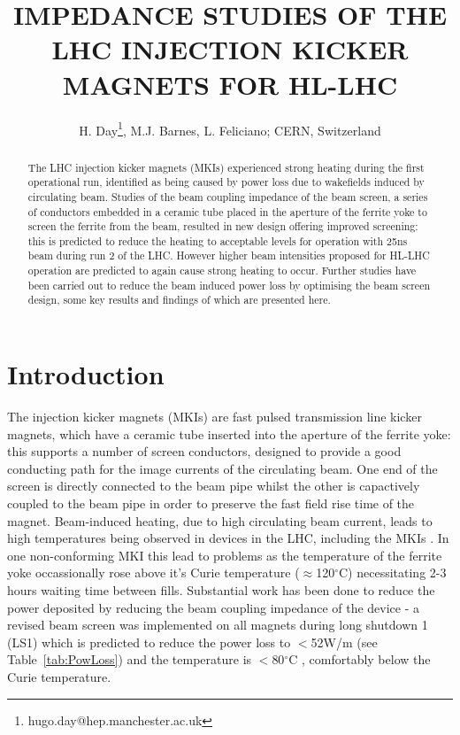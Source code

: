 \documentclass[a4paper,
              ]{jacow}
\begin{document}
\title{IMPEDANCE STUDIES OF THE LHC INJECTION KICKER MAGNETS FOR HL-LHC}
\author{H. Day\thanks{hugo.day@hep.manchester.ac.uk}, M.J. Barnes, L. Feliciano;  CERN, Switzerland}

\maketitle 


\begin{abstract}
The LHC injection kicker magnets (MKIs) experienced strong heating during the first operational run, identified as being caused by power loss due to wakefields induced by circulating beam. Studies of the beam coupling impedance of the beam screen, a series of conductors embedded in a ceramic tube placed in the aperture of the ferrite yoke to screen the ferrite from the beam, resulted in new design offering improved screening: this is predicted to reduce the heating to acceptable levels for operation with 25ns beam during run 2 of the LHC. However higher beam intensities proposed for HL-LHC operation are predicted to again cause strong heating to occur. Further studies have been carried out to reduce the beam induced power loss by optimising the beam screen design, some key results and findings of which are presented here.
\end{abstract}

\section{Introduction}

The injection kicker magnets (MKIs) are fast pulsed transmission line kicker magnets, which have a ceramic tube inserted into the aperture of the ferrite yoke: this supports a number of screen conductors, designed to provide a good conducting path for the image currents of the circulating beam. One end of the screen is directly connected to the beam pipe whilst the other is capactively coupled to the beam pipe in order to preserve the fast field rise time of the magnet. Beam-induced heating, due to high circulating beam current, leads to high temperatures being observed in devices in the LHC, including the MKIs \cite{mki-heatingTemp}. In one non-conforming MKI this lead to problems as the temperature of the ferrite yoke occassionally rose above it's Curie temperature ($\approx$120$^{\circ}$C) necessitating 2-3 hours waiting time between fills. Substantial work has been done to reduce the power deposited by reducing the beam coupling impedance of the device - a revised beam screen was implemented on all magnets during long shutdown 1 (LS1) which is predicted to reduce the power loss to $<$52W/m (see Table~\ref{tab:PowLoss}) and the temperature is $<$80$^{\circ}$C \cite{lorenaStrat}, comfortably below the Curie temperature. 
\end{document}
